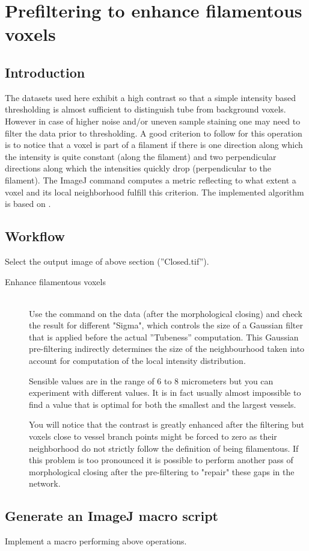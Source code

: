 \section{Prefiltering to enhance filamentous voxels}

\subsection{Introduction}
The datasets used here exhibit a high contrast so that a simple intensity based thresholding is almost sufficient to distinguish tube from background voxels. However in case of higher noise and/or uneven sample staining one may need to filter the data prior to thresholding. A good criterion to follow for this operation is to notice that a voxel is part of a filament if there is one direction along which the intensity is quite constant (along the filament) and two perpendicular directions along which the intensities quickly drop (perpendicular to the filament). The ImageJ command  computes a metric reflecting to what extent a voxel and its local neighborhood fulfill this criterion. The implemented algorithm is based on \cite{Sato1998}.

\subsection{Workflow}
Select the output image of above section (''Closed.tif'').

\begin{description}

\item[Enhance filamentous voxels]\hfill\\
Use the  command on the data (after the morphological closing) and check the result for different "Sigma", which controls the size of a Gaussian filter that is applied before the actual ''Tubeness'' computation.
This Gaussian pre-filtering indirectly determines the size of the neighbourhood taken into account for computation of the local intensity distribution.

Sensible values are in the range of 6 to 8 micrometers but you can experiment with different values. It is in fact usually almost impossible to find a value that is optimal for both the smallest and the largest vessels. 

You will notice that the contrast is greatly enhanced after the filtering but voxels close to vessel branch points might be forced to zero as their neighborhood do not strictly follow the definition of being filamentous. If this problem is too pronounced it is possible to perform another pass of morphological closing after the pre-filtering to "repair" these gaps in the network.
\end{description}

\subsection{Generate an ImageJ macro script}
Implement a macro performing above operations.

